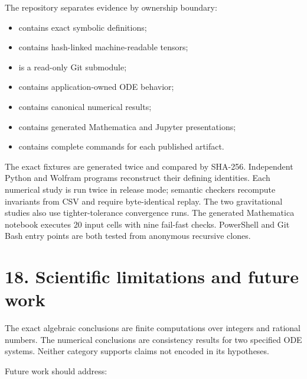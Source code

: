 \documentclass[11pt]{article}
\begin{document}
The repository separates evidence by ownership boundary:

\begin{itemize}
\item \texttt{} contains exact symbolic definitions;
\item \texttt{} contains hash-linked machine-readable tensors;
\item \texttt{} is a read-only Git submodule;
\item \texttt{} contains application-owned ODE behavior;
\item \texttt{} contains canonical numerical results;
\item \texttt{} contains generated Mathematica and Jupyter presentations;
\item \texttt{} contains complete commands for each published artifact.
\end{itemize}

The exact fixtures are generated twice and compared by SHA-256. Independent Python and Wolfram programs reconstruct their defining identities. Each numerical study is run twice in release mode; semantic checkers recompute invariants from CSV and require byte-identical replay. The two gravitational studies also use tighter-tolerance convergence runs. The generated Mathematica notebook executes 20 input cells with nine fail-fast checks. PowerShell and Git Bash entry points are both tested from anonymous recursive clones.

\section{18. Scientific limitations and future work}

The exact algebraic conclusions are finite computations over integers and rational numbers. The numerical conclusions are consistency results for two specified ODE systems. Neither category supports claims not encoded in its hypotheses.

Future work should address:
\end{document}
